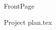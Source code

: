 \documentclass{article}
\begin{document}
{FrontPage}

\frontmatter


\mainmatter





{Project plan.tex}




\end{document}
